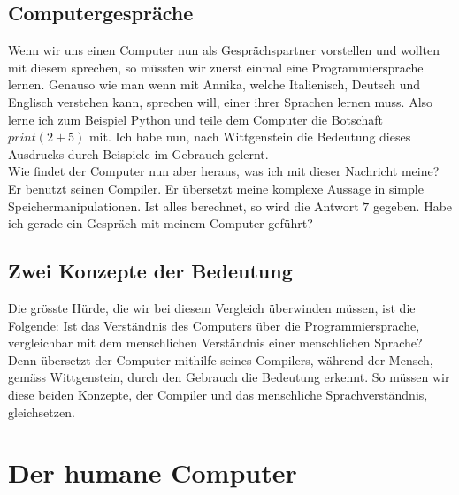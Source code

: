 \documentclass[a4paper,12pt]{article}
\begin{document}
\subsection{Computergespräche}
Wenn wir uns einen Computer nun als Gesprächspartner vorstellen und wollten mit diesem sprechen, so müssten wir zuerst einmal eine Programmiersprache lernen. Genauso wie man wenn mit Annika, welche Italienisch, Deutsch und Englisch verstehen kann, sprechen will, einer ihrer Sprachen lernen muss. Also lerne ich zum Beispiel Python und teile dem Computer die Botschaft $print(2 + 5)$ mit. Ich habe nun, nach Wittgenstein die Bedeutung dieses Ausdrucks durch Beispiele im Gebrauch gelernt.  \\
Wie findet der Computer nun aber heraus, was ich mit dieser Nachricht meine? Er benutzt seinen Compiler. Er übersetzt meine komplexe Aussage in simple Speichermanipulationen. Ist alles berechnet, so wird die Antwort $7$ gegeben. Habe ich gerade ein Gespräch mit meinem Computer geführt?

\subsection{Zwei Konzepte der Bedeutung}
Die grösste Hürde, die wir bei diesem Vergleich überwinden müssen, ist die Folgende: Ist das Verständnis des Computers über die Programmiersprache, vergleichbar mit dem menschlichen Verständnis einer menschlichen Sprache? Denn übersetzt der Computer mithilfe seines Compilers, während der Mensch, gemäss Wittgenstein, durch den Gebrauch die Bedeutung erkennt. So müssen wir diese beiden Konzepte, der Compiler und das menschliche Sprachverständnis, gleichsetzen.


\section{Der humane Computer}
\end{document}

